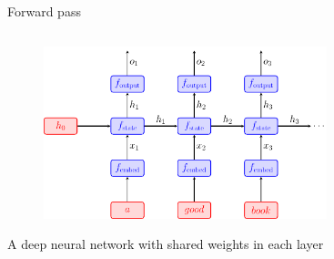 \documentclass[usenames,dvipsnames,notes,11pt,aspectratio=169,hyperref={colorlinks=true, linkcolor=blue}]{beamer}
\newcommand{\pdfnote}[1]{}
\begin{document}
\begin{frame}
    {Forward pass}
    \begin{columns}
        \begin{column}{0.6\columnwidth}
    \begin{figure}
        \includegraphics[height=5cm]{figures/rnn}
    \end{figure}
        A deep neural network with shared weights in each layer
        \end{column}
    \end{columns}
    \pdfnote{
        Here x are word embeddings, so we are omitting the input embedding layer that maps one-hot representation of words to dense word vectors.
    }
    \pdfnote{
        The recurrent unit has two learnable matrices to combine prev state and input.
    }
    \pdfnote{
        The output o is a real vector, and we can take that as a feature vector of each word with the left context,
        which can be then used to predict the next word.
    }
\end{frame}
\end{document}
